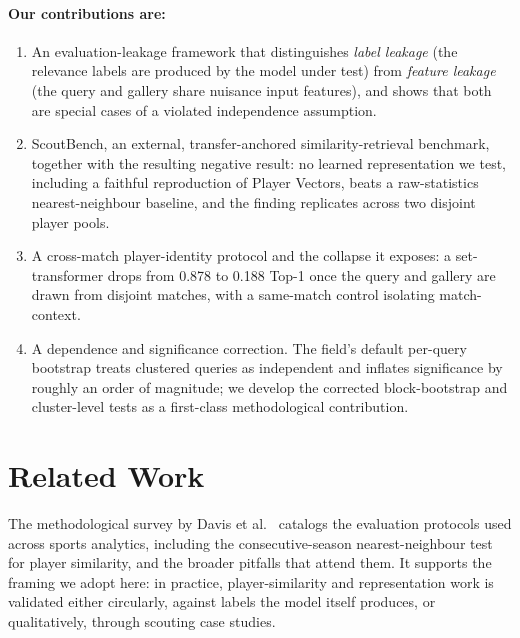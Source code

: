 \paragraph{Our contributions are:}
\begin{enumerate}[leftmargin=*]
\item An evaluation-leakage framework that distinguishes \emph{label leakage}
(the relevance labels are produced by the model under test) from
\emph{feature leakage} (the query and gallery share nuisance input features),
and shows that both are special cases of a violated independence assumption.
\item ScoutBench, an external, transfer-anchored similarity-retrieval
benchmark, together with the resulting negative result: no learned
representation we test, including a faithful reproduction of Player Vectors,
beats a raw-statistics nearest-neighbour baseline, and the finding replicates
across two disjoint player pools.
\item A cross-match player-identity protocol and the collapse it exposes: a
set-transformer drops from 0.878 to 0.188 Top-1 once the query and gallery are
drawn from disjoint matches, with a same-match control isolating match-context.
\item A dependence and significance correction. The field's default per-query
bootstrap treats clustered queries as independent and inflates significance by
roughly an order of magnitude; we develop the corrected block-bootstrap and
cluster-level tests as a first-class methodological contribution.
\end{enumerate}

\section{Related Work}
\label{sec:related}

The methodological survey by Davis et al.~\cite{davis2024methodology} catalogs
the evaluation protocols used across sports analytics, including the
consecutive-season nearest-neighbour test for player similarity, and the
broader pitfalls that attend them. It supports the framing we adopt here: in
practice, player-similarity and representation work is validated either
circularly, against labels the model itself produces, or qualitatively,
through scouting case studies.

